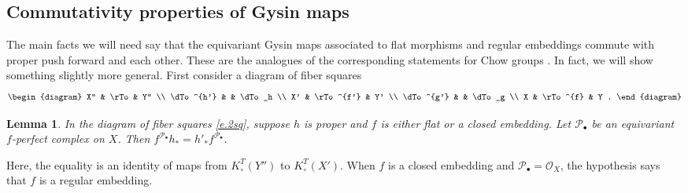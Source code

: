 \documentclass[11pt]{amsart}
\newtheorem{lemma}[theorem]{Lemma}
\theoremstyle{definition}
\begin{document}
\subsection{Commutativity properties of Gysin maps}  

The main facts we will need say that the equivariant Gysin maps associated to flat morphisms and regular embeddings commute with proper push forward and each other.  These are the analogues of the corresponding statements for Chow groups \cite[Proposition~6.3, Theorem~6.4]{it}.  
In fact, we will show something slightly more general.  First consider a diagram of fiber squares
\begin{equation}\label{e.2sq}
\begin{diagram}
 X'' & \rTo & Y''  \\
\dTo^{h'}  & & \dTo_h   \\
 X' & \rTo^{f'} & Y'  \\
\dTo^{g'} & & \dTo_g \\
X  & \rTo^{f}  & Y .
\end{diagram}
\end{equation}

\begin{lemma}\label{l.push-commute}
In the diagram of fiber squares \eqref{e.2sq}, suppose $h$ is proper and $f$ is either flat or a closed embedding.  Let ${\mathscr{P}}_\bullet$ be an equivariant $f$-perfect complex on $X$. Then $f^{{\mathscr{P}}_\bullet} h_* = h'_* f^{{\mathscr{P}}_\bullet}$.
\end{lemma}

\noindent Here, the equality is an identity of maps from $K_\circ^T(Y'')$ to $K_\circ^T(X')$.  When $f$ is a closed embedding and ${\mathscr{P}}_\bullet ={\mathcal{O}}_X$, the hypothesis says that $f$ is a regular embedding.
\end{document}

